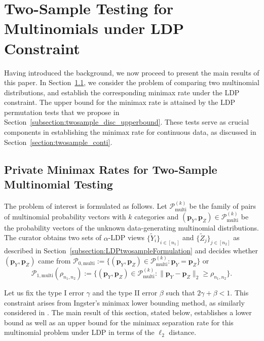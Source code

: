 \documentclass[twoside,11pt]{article}
\newcommand{\distClassGeneric}{\mathcal{P}}
\newcommand{\distclassMultinomial}{\distClassGeneric_{\mathrm{multi}}^{(\alphabetSize)}}
\newcommand{\rhoTwosample}{\rho_{\sampleSize_1, \sampleSize_2}}
\newcommand{\rvTwo}{Y}
\newcommand{\rvThree}{Z}
\newcommand{\rvY}{Y}
\newcommand{\rvYPriv}{\tilde{\rvY}} %
\newcommand{\rvZ}{Z}
\newcommand{\rvZPriv}{\tilde{\rvZ}} %
\newcommand{\sampleIndexOne}{i}
\newcommand{\sampleIndexTwo}{j}
\newcommand{\sampleSets}[3]{\{{#1}_{#2}\}_{#2 \in [#3]}}
\newcommand{\alphabetSize}{k} %
\newcommand{\sampleSize}{n}
\newcommand{\probVec}{\mathbf{p}} %
\newcommand{\privacyParameter}{\alpha} %
\newcommand{\maxErrorTypeTwo}{\beta} %
\newcommand{\maxErrorTypeOne}{\gamma} %
\begin{document}
\section{Two-Sample Testing for Multinomials under LDP Constraint}\label{section:twosample_disc}  
Having introduced the background, we now proceed to present the main results of this paper. In Section~\ref{subsection:twosample_multinomial_rates}, we consider the problem of comparing two multinomial distributions, and establish the corresponding minimax rate under the LDP constraint. The upper bound for the minimax rate is attained by the LDP permutation tests that we propose in Section~\ref{subsection:twosample_disc_upperbound}. These tests serve as crucial components in establishing the minimax rate for continuous data, as discussed in Section~\ref{section:twosample_conti}.

\subsection{Private Minimax Rates for Two-Sample Multinomial Testing}\label{subsection:twosample_multinomial_rates}
The problem of interest is formulated as follows. Let $\distclassMultinomial$ be the family of pairs of multinomial probability vectors with $\alphabetSize$ categories and $(\probVec_\rvY , \probVec_\rvZ) \in \distclassMultinomial$ be the probability vectors of the unknown data-generating multinomial distributions. The curator obtains two sets of $\privacyParameter$-LDP views $\sampleSets{\rvYPriv}{\sampleIndexOne}{\sampleSize_1}$ and $\sampleSets{\rvZPriv}{\sampleIndexTwo}{\sampleSize_2}$ as described in Section~\ref{subsection:LDPtwosampleFormulation}
and decides whether $(\probVec_Y , \probVec_Z)$ came from $\distClassGeneric_{0,\mathrm{multi}} := \{ (\probVec_\rvY , \probVec_\rvZ) \in \distclassMultinomial: \probVec_\rvY = \probVec_\rvZ \}$ or
\begin{equation}\label{eq:settingTwosampleDisc}
	\mathcal{P}_{1,\mathrm{multi}}(\rho_{n_1,n_2})
	:=
	\bigl\{
	(\probVec_\rvY , \probVec_\rvZ) \in \distclassMultinomial:
	\| \probVec_\rvTwo - \probVec_\rvThree \|_2 \geq \rhoTwosample
	\bigr\}.   
\end{equation}

Let us fix the type I error $\maxErrorTypeOne$ and the type II error $\maxErrorTypeTwo$ such that $2\maxErrorTypeOne + \maxErrorTypeTwo < 1$. This constraint arises from Ingster's minimax lower bounding method, as similarly considered in \cite{Lam-Weil2021MinimaxConstraint}. The main result of this section, stated below, establishes a lower bound as well as an upper bound for the minimax separation rate for this multinomial problem under LDP in terms of the $\ell_2$ distance.
\end{document}
